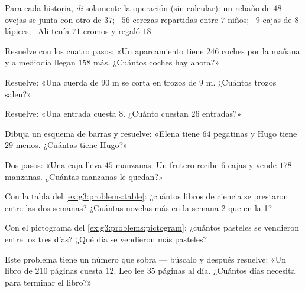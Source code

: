 \begin{exercise}[$\star$]\label{exo:g3:problems:1}
Para cada historia, \emph{di} solamente la operación (sin calcular):
un rebaño de $48$ ovejas se junta con otro de $37$; \ $56$ cerezas repartidas
entre $7$ niños; \ $9$ cajas de $8$ lápices; \ Ali tenía $71$ cromos
y regaló $18$.
\end{exercise}

\begin{exercise}[$\star$]\label{exo:g3:problems:2}
Resuelve con los cuatro pasos: «Un aparcamiento tiene $246$ coches por la
mañana y a mediodía llegan $158$ más. ¿Cuántos coches hay ahora?»
\end{exercise}

\begin{exercise}[$\star$]\label{exo:g3:problems:3}
Resuelve: «Una cuerda de $90$ m se corta en trozos de $9$ m. ¿Cuántos
trozos salen?»
\end{exercise}

\begin{exercise}[$\star$]\label{exo:g3:problems:4}
Resuelve: «Una entrada cuesta $8$. ¿Cuánto cuestan $26$ entradas?»
\end{exercise}

\begin{exercise}[$\star$]\label{exo:g3:problems:5}
Dibuja un esquema de barras y resuelve: «Elena tiene $64$ pegatinas y Hugo tiene
$29$ menos. ¿Cuántas tiene Hugo?»
\end{exercise}

\begin{exercise}[$\star$]\label{exo:g3:problems:6}
Dos pasos: «Una caja lleva $45$ manzanas. Un frutero recibe $6$ cajas
y vende $178$ manzanas. ¿Cuántas manzanas le quedan?»
\end{exercise}

\begin{exercise}[$\star$]\label{exo:g3:problems:7}
Con la tabla del \cref{ex:g3:problems:table}: ¿cuántos libros de ciencia
se prestaron entre las dos semanas? ¿Cuántas novelas más
en la semana 2 que en la 1?
\end{exercise}

\begin{exercise}[$\star$]\label{exo:g3:problems:8}
Con el pictograma del \cref{ex:g3:problems:pictogram}: ¿cuántos
pasteles se vendieron entre los tres días? ¿Qué día se vendieron
más pasteles?
\end{exercise}

\begin{exercise}[$\star$]\label{exo:g3:problems:9}
Este problema tiene un número que sobra --- búscalo y después resuelve: «Un
libro de $210$ páginas cuesta $12$. Leo lee $35$ páginas al día. ¿Cuántos
días necesita para terminar el libro?»
\end{exercise}

